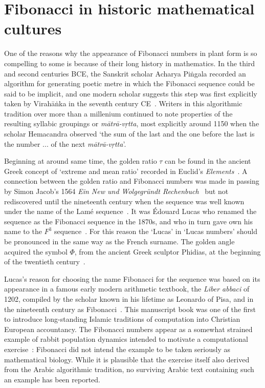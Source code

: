 \section{Fibonacci in historic mathematical cultures}
One of the reasons why the appearance of Fibonacci numbers in plant form is so compelling to some is because of their long history in mathematics. 
In the third and second centuries BCE, the Sanskrit scholar Acharya Piṅgala recorded an algorithm for generating poetic metre in which the Fibonacci sequence could be said to be implicit, and 
one modern scholar suggests this step was first explicitly taken by Virahāṅka in the seventh century CE~\autocite{singhSocalledFibonacciNumbers1985,velankarVrttajatisamuccayaKaviVirahanka1962}.  Writers in this algorithmic tradition over more than a millenium continued to note properties of the resulting syllabic groupings or \textit{mātrā-vṛtta}, most explicitly around 1150 when the scholar Hemacandra observed `the sum of the last and the one before the last is the number ... of the next \textit{mātrā-vṛtta}'\autocite{singhSocalledFibonacciNumbers1985}. 

Beginning at around same time, the golden ratio $\tau$ can be found in the ancient Greek concept of `extreme and mean ratio' recorded in Euclid's \textit{Elements}~\autocite{herz-fischlerMathematicalHistoryDivision1987}. 
A connection between the golden ratio and Fibonacci numbers was made in passing by Simon Jacob's 1564 \textit{Ein New und Wolgegründt Rechenbuch}~\cite{schreiberSupplementShallitsPaper1995} but not rediscovered until the nineteenth century when the sequence was well known under the name of the Lamé sequence~\autocite{lucasTheorieNombresPremiers1876}. It was Édouard Lucas who renamed the sequence as the Fibonacci sequence in the 1870s, and who in turn gave own his name to the $F^3$ sequence~\autocite{lucasTheorieNombresPremiers1876}. For this reason the `Lucas' in `Lucas numbers' should be pronounced in the same way as the French surname.  The golden angle acquired the symbol $\Phi$, from the ancient Greek sculptor Phidias, at the beginning of the twentieth century~\autocite{barrParametersBeauty1929}.

Lucas's reason for choosing the name Fibonacci for the sequence was based on its appearance in a famous early modern arithmetic textbook, the \textit{Liber abbaci} of 1202, compiled by the scholar known in his lifetime as Leonardo of Pisa, and in the nineteenth century as Fibonacci~\cite{siglerFibonaccisLiberAbaci2002}. This manuscript book was one of the first to introduce long-standing Islamic traditions of computation into Christian European accountancy.  The Fibonacci numbers appear as a somewhat strained example of rabbit population dynamics intended to motivate a computational exercise~\cite{hoyrupFibonacciProtagonistWitness2014}: Fibonacci did not intend the example to be taken seriously as mathematical biology.  While it is plausible that the exercise itself also derived from the Arabic algorithmic tradition, no surviving Arabic text containing such an example has been reported.


